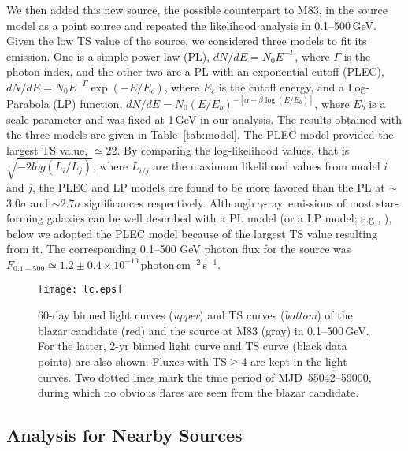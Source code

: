 \documentclass[twocolumn]{aastex631}
\newcommand{\gr}{$\gamma$-ray}
\begin{document}
We then added this new source, the possible counterpart to M83, in the source 
model as a point source and repeated the likelihood analysis in 0.1--500\,GeV.
Given the low TS value of the source, we considered three models to fit its 
emission.  One is a simple power law (PL), $dN/dE=N_{0}E^{-\Gamma}$, 
where $\Gamma$ is the photon index, and the other two are a PL with 
an exponential cutoff (PLEC), $dN/dE=N_{0}E^{-\Gamma}\exp(-E/E_c)$, 
where $E_{c}$ is the cutoff energy, and a Log-Parabola (LP) function,
$dN/dE = N_{0}(E/E_{b})^{-[\alpha + \beta\log(E/E_{b})]}$, where $E_b$ is
a scale parameter and was fixed at 1\,GeV in our analysis.
The results obtained with the three models are given in Table~\ref{tab:model}.
The PLEC model provided the largest TS value, $\simeq$22. By comparing
the log-likelihood values, that is 
$\sqrt{-2 log(L_{i}/L_{j})}$, where $L_{i/j}$ are the maximum likelihood 
values from model $i$ and $j$, 
the PLEC and LP models are found to be more favored than the PL at 
$\sim$3.0$\sigma$ and $\sim$2.7$\sigma$ significances respectively.
Although \gr\ emissions of most star-forming galaxies can be well described 
with a PL model (or a LP model; e.g., \citealt{aje+20}), below we adopted 
the PLEC model because of the largest TS value resulting from it. The 
corresponding 0.1--500 GeV photon flux for the source was 
$F_{0.1-500}\simeq 1.2\pm0.4\times10^{-10}$\,photon\,cm$^{-2}$\,s$^{-1}$.
\begin{figure*}
   \centering
   \texttt{[image: lc.eps]}
	\caption{60-day binned light curves ({\it upper}) and TS curves
	({\it bottom}) of the blazar candidate (red) and the source at M83
	(gray) in 0.1--500\,GeV. 
	For the latter, 2-yr binned light curve and TS curve (black 
	data points) are also shown.
	Fluxes with TS$\geq$4 are kept in the light 
	curves. Two dotted lines mark the time period of MJD~55042--59000,
	during which no obvious flares are seen from the blazar candidate.
}
   \label{fig:lc}
\end{figure*}

\subsection{Analysis for Nearby Sources} 
\label{subsec:near}
\end{document}
